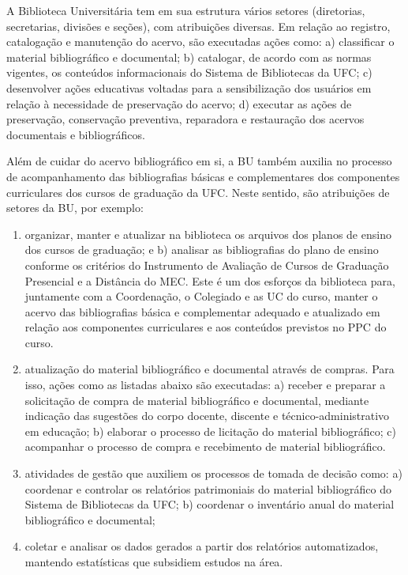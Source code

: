 A Biblioteca Universitária tem em sua estrutura vários setores (diretorias, secretarias, divisões e seções), com atribuições diversas. Em relação ao registro, catalogação e manutenção do acervo, são executadas ações como: a) classificar o material bibliográfico e documental; b) catalogar, de acordo com as normas vigentes, os conteúdos informacionais do Sistema de Bibliotecas da UFC; c) desenvolver ações educativas voltadas para a sensibilização dos usuários em relação à necessidade de preservação do acervo; d) executar as ações de preservação, conservação preventiva, reparadora e restauração dos acervos documentais e bibliográficos.

Além de cuidar do acervo bibliográfico em si, a BU também auxilia no processo de acompanhamento das bibliografias básicas e complementares dos componentes curriculares dos cursos de graduação da UFC. Neste sentido, são atribuições de setores da BU, por exemplo:
\begin{enumerate}
    \item organizar, manter e atualizar na biblioteca os arquivos dos planos de ensino dos cursos de graduação; e b) analisar as bibliografias do plano de ensino conforme os critérios do Instrumento de Avaliação de Cursos de Graduação Presencial e a Distância do MEC. Este é um dos esforços da biblioteca para, juntamente com a Coordenação, o Colegiado e as UC do curso, manter o acervo das bibliografias básica e complementar adequado e atualizado em relação aos componentes curriculares e aos conteúdos previstos no PPC do curso.
    \item atualização do material bibliográfico e documental através de compras. Para isso, ações como as listadas abaixo são executadas: a) receber e preparar a solicitação de compra de material bibliográfico e documental, mediante indicação das sugestões do corpo docente, discente e técnico-administrativo em educação; b) elaborar o processo de licitação do material bibliográfico; c) acompanhar o processo de compra e recebimento de material bibliográfico.
    \item atividades de gestão que auxiliem os processos de tomada de decisão como: a) coordenar e controlar os relatórios patrimoniais do material bibliográfico do Sistema de Bibliotecas da UFC; b) coordenar o inventário anual do material bibliográfico e documental;
    \item coletar e analisar os dados gerados a partir dos relatórios automatizados, mantendo estatísticas que subsidiem estudos na área.    
\end{enumerate}


